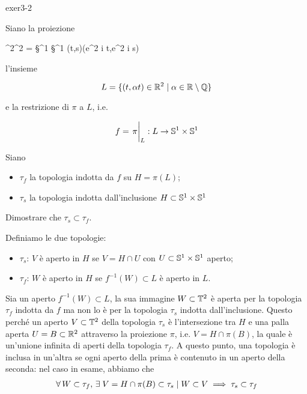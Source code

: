
{exer3-2}
{
Siano la proiezione

\map{\pi}
	{\R^{2}}{\T^{2} = \S^{1} \times \S^{1}}
	{(t,s)}{(e^{2 \pi i t},e^{2 \pi i s})}

l'insieme

\begin{equation}
	L = \{ (t,\alpha t) \in \R^{2} \mid \alpha \in \R \setminus \Q \}
\end{equation}

e la restrizione di $ \pi $ a $ L $, i.e.

\begin{equation}
	f = \eval{\pi}_{L} : L \to \S^{1} \times \S^{1}
\end{equation}

Siano

\begin{itemize}
	\item $ \tau_{f} $ la topologia indotta da $ f $ su $ H = \pi(L) $;
	
	\item $ \tau_{s} $ la topologia indotta dall'inclusione $ H \subset \S^{1} \times \S^{1} $
\end{itemize}

Dimostrare che $ \tau_{s} \subset \tau_{f} $.
}
{
Definiamo le due topologie:

\begin{itemize}
	\item $ \tau_{s} $: $ V $ è aperto in $ H $ se $ V = H \cap U $ con $ U \subset \S^{1} \times \S^{1} $ aperto;
	
	\item $ \tau_{f} $: $ W $ è aperto in $ H $ se $ f^{-1}(W) \subset L $ è aperto in $ L $.
\end{itemize}

Sia un aperto $ f^{-1}(W) \subset L $, la sua immagine $ W \subset \T^{2} $ è aperta per la topologia $ \tau_{f} $ indotta da $ f $ ma non lo è per la topologia $ \tau_{s} $ indotta dall'inclusione. Questo perché un aperto $ V \subset \T^{2} $ della topologia $ \tau_{s} $ è l'intersezione tra $ H $ e una palla aperta $ U = B \subset \R^{2} $ attraverso la proiezione $ \pi $, i.e. $ V = H \cap \pi(B) $, la quale è un'unione infinita di aperti della topologia $ \tau_{f} $. A questo punto, una topologia è inclusa in un'altra se ogni aperto della prima è contenuto in un aperto della seconda: nel caso in esame, abbiamo che
%
\begin{gather}
	\forall \, W \subset \tau_{f}, \, \E V = H \cap \pi(B) \subset \tau_{s} \mid W \subset V %
	\implies %
	\tau_{s} \subset \tau_{f}
\end{gather}

}

